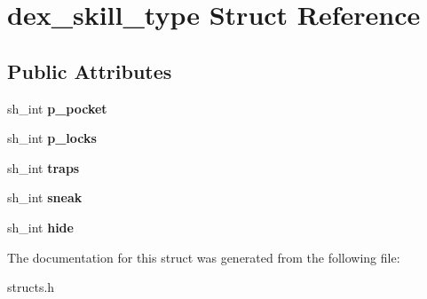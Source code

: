 \hypertarget{structdex__skill__type}{}\section{dex\+\_\+skill\+\_\+type Struct Reference}
\label{structdex__skill__type}
\subsection*{Public Attributes}
\begin{DoxyCompactItemize}
\item 
\mbox{\label{structdex__skill__type_ab6495f99aa8f01baaa8bd6588de731ee}} 
sh\+\_\+int {\bfseries p\+\_\+pocket}
\item 
\mbox{\label{structdex__skill__type_a99275a125fccf0e4140ab2030f92d17d}} 
sh\+\_\+int {\bfseries p\+\_\+locks}
\item 
\mbox{\label{structdex__skill__type_a05176fa0af735ef8d298f8a9d2c59f8c}} 
sh\+\_\+int {\bfseries traps}
\item 
\mbox{\label{structdex__skill__type_ac897c57bedeebe1f072707dbf145e947}} 
sh\+\_\+int {\bfseries sneak}
\item 
\mbox{\label{structdex__skill__type_aadc12b77d089c32f86531af2078cf32e}} 
sh\+\_\+int {\bfseries hide}
\end{DoxyCompactItemize}


The documentation for this struct was generated from the following file\+:\begin{DoxyCompactItemize}
\item 
structs.\+h\end{DoxyCompactItemize}
